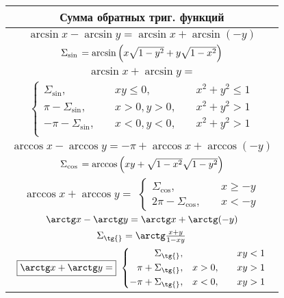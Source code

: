 \begin{tabu}[t]{||c||}
	\hline
		\textbf{Сумма обратных триг. функций} \\
	\hline
	\hline
		$ \arcsin x - \arcsin y =  \arcsin x + \arcsin(-y) $ \\
		$ \Sigma_{\sin{}} = \arcsin\left(x\sqrt{\mathstrut 1-y^2}+y\sqrt{\mathstrut 1-x^2}\right) $ \\
	\hline
		$ \boxed{\arcsin x + \arcsin y =} $ \\
		$ \left\{ \begin{aligned}
			\Sigma_{\sin{}}, \quad & xy \leqslant 0,\quad & x^2 + y^2 \leqslant 1 \\
			\pi-\Sigma_{\sin{}}, \quad & x > 0, y > 0,\quad  & x^2 + y^2 > 1 \\
			-\pi-\Sigma_{\sin{}}, \quad & x < 0, y < 0,\quad & x^2 + y^2 > 1 \\
		\end{aligned} \right. $ \\
	\hline
	\hline
		$ \arccos x - \arccos y =  -\pi + \arccos x + \arccos(-y) $ \\
		$ \Sigma_{\cos{}} = \arccos\left(xy+\sqrt{\mathstrut 1-x^2}\sqrt{\mathstrut 1-y^2}\right) $ \\
	\hline
		$ \boxed{\arccos x + \arccos y =} $
		$ \left\{ \begin{aligned}
			\Sigma_{\cos{}}, \quad & x \geqslant -y \\
			2\pi-\Sigma_{\cos{}}, \quad & x < -y
		\end{aligned} \right. $ \\
	\hline
	\hline
		$ \arctg x - \arctg y =  \arctg x + \arctg(-y) $ \\
		$ \Sigma_{\tg{}} = \arctg\frac{x+y}{1-xy} $ \\
	\hline
		$ \boxed{\arctg x + \arctg y =} $
		$ \left\{ \begin{aligned}
			\Sigma_{\tg{}}, \quad & & xy < 1 \\
			\pi+\Sigma_{\tg{}}, \quad & x > 0, \quad & xy>1 \\
			-\pi+\Sigma_{\tg{}}, \quad & x < 0, \quad & xy>1 \\
		\end{aligned} \right. $ \\
	\hline
\end{tabu}

